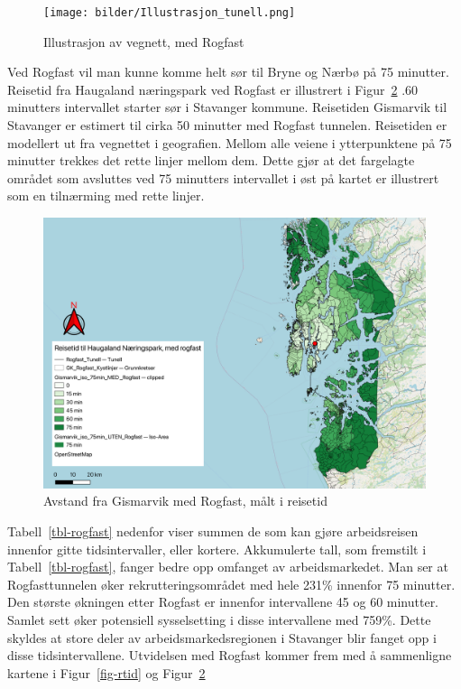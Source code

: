 \documentclass[
]{article}
\begin{document}
\begin{figure}[H]

{\centering \texttt{[image: bilder/Illustrasjon\_tunell.png]}

}

\caption{\label{fig-prosj-rog}Illustrasjon av vegnett, med Rogfast}

\end{figure}

Ved Rogfast vil man kunne komme helt sør til Bryne og Nærbø på 75
minutter. Reisetid fra Haugaland næringspark ved Rogfast er illustrert i
Figur~\ref{fig-tid-rf} .60 minutters intervallet starter sør i Stavanger
kommune. Reisetiden Gismarvik til Stavanger er estimert til cirka 50
minutter med Rogfast tunnelen. Reisetiden er modellert ut fra vegnettet
i geografien. Mellom alle veiene i ytterpunktene på 75 minutter trekkes
det rette linjer mellom dem. Dette gjør at det fargelagte området som
avsluttes ved 75 minutters intervallet i øst på kartet er illustrert som
en tilnærming med rette linjer.

\begin{figure}[H]

{\centering \includegraphics{bilder/reisetid_rogfast.png}

}

\caption{\label{fig-tid-rf}Avstand fra Gismarvik med Rogfast, målt i
reisetid}

\end{figure}

Tabell~\ref{tbl-rogfast} nedenfor viser summen de som kan gjøre
arbeidsreisen innenfor gitte tidsintervaller, eller kortere. Akkumulerte
tall, som fremstilt i Tabell~\ref{tbl-rogfast}, fanger bedre opp
omfanget av arbeidsmarkedet. Man ser at Rogfasttunnelen øker
rekrutteringsområdet med hele 231\% innenfor 75 minutter. Den største
økningen etter Rogfast er innenfor intervallene 45 og 60 minutter.
Samlet sett øker potensiell sysselsetting i disse intervallene med
759\%. Dette skyldes at store deler av arbeidsmarkedsregionen i
Stavanger blir fanget opp i disse tidsintervallene. Utvidelsen med
Rogfast kommer frem med å sammenligne kartene i Figur~\ref{fig-rtid} og
Figur~\ref{fig-tid-rf}
\end{document}
